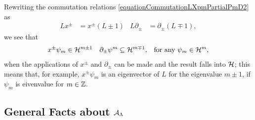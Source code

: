 Rewriting the commutation relations \eqref{equationCommutationLXpmPartialPmD2} as
\begin{align}\label{equationCommutatorRewrittenXPMIncreasesDecreasesDegreesD2Hilbert}
L x^\pm &= x^\pm(L \pm 1) &  L \partial_\pm &= \partial_\pm (L \mp 1),
\end{align}
we see that
\begin{align}\label{equationX+XPlusIncreasesDecreasesDegreeEigenvalueL}
    x^\pm \psi_m &\in \mathcal H^{m \pm 1} & \partial_\pm \psi^{m} &\subseteq \mathcal H^{m \mp 1}, & \text{for any }\psi_m \in \mathcal H^m,
\end{align}
when the applications of $x^\pm$ and $\partial_\pm$ can be made and the result falls into $\mathcal H$; this means that, for example, $x^\pm \psi_m$ is an eigenvector of $L$ for the eigenvalue $m \pm 1$, if $\psi_m$ is eivenvalue for $m \in \mathbb{Z}$.



\subsection{General Facts about $\mathcal A_{\Lambda}$}

